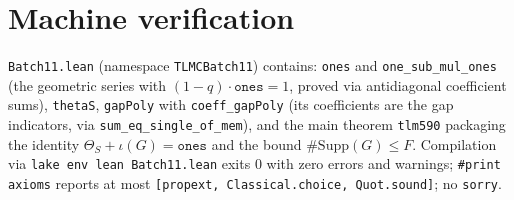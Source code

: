 \documentclass[11pt]{article}
\theoremstyle{definition}
\theoremstyle{remark}
\begin{document}
\section{Machine verification}
\texttt{Batch11.lean} (namespace \texttt{TLMCBatch11}) contains: \texttt{ones} and \texttt{one\_sub\_mul\_ones} (the geometric series with $(1 - q)\cdot\texttt{ones} = 1$, proved via antidiagonal coefficient sums), \texttt{thetaS}, \texttt{gapPoly} with \texttt{coeff\_gapPoly} (its coefficients are the gap indicators, via \texttt{sum\_eq\_single\_of\_mem}), and the main theorem \texttt{tlm590} packaging the identity $\Theta_S + \iota(G) = \texttt{ones}$ and the bound $\#\mathrm{Supp}(G) \le F$. Compilation via \texttt{lake env lean Batch11.lean} exits $0$ with zero errors and warnings; \texttt{\#print axioms} reports at most \texttt{[propext, Classical.choice, Quot.sound]}; no \texttt{sorry}.
\end{document}
